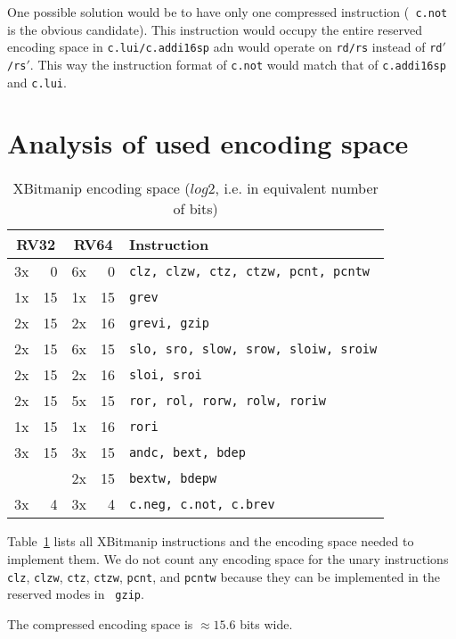One possible solution would be to have only one compressed instruction ({\tt
c.not} is the obvious candidate). This instruction would occupy the entire
reserved encoding space in {\tt c.lui/c.addi16sp} adn would operate on {\tt rd/rs}
instead of {\tt rd$'$/rs$'$}. This way the instruction format of {\tt c.not}
would match that of {\tt c.addi16sp} and {\tt c.lui}.

\section{Analysis of used encoding space}

\begin{table}
\begin{center}
\begin{tabular}{rr|rr|l}
\multicolumn{2}{c|}{RV32} & \multicolumn{2}{c|}{RV64} & Instruction \\
\hline
3x &  0 & 6x &  0 & {\tt clz, clzw, ctz, ctzw, pcnt, pcntw} \\
\hline
1x & 15 & 1x & 15 & {\tt grev} \\
2x & 15 & 2x & 16 & {\tt grevi, gzip} \\
\hline
2x & 15 & 6x & 15 & {\tt slo, sro, slow, srow, sloiw, sroiw} \\
2x & 15 & 2x & 16 & {\tt sloi, sroi} \\
\hline
2x & 15 & 5x & 15 & {\tt ror, rol, rorw, rolw, roriw} \\
1x & 15 & 1x & 16 & {\tt rori} \\
\hline
3x & 15 & 3x & 15 & {\tt andc, bext, bdep} \\
   &    & 2x & 15 & {\tt bextw, bdepw} \\
\hline
3x &  4 & 3x &  4 & {\tt c.neg, c.not, c.brev} \\
\end{tabular}
\end{center}
\caption{XBitmanip encoding space ($log2$, i.e. in equivalent number of bits)}
\label{encspace-tab}
\end{table}

Table~\ref{encspace-tab} lists all XBitmanip instructions and the encoding
space needed to implement them.  We do not count any encoding space for the
unary instructions {\tt clz}, {\tt clzw}, {\tt ctz}, {\tt ctzw}, {\tt pcnt},
and {\tt pcntw} because they can be implemented in the reserved modes in {\tt
gzip}.

The compressed encoding space is $\approx 15.6$ bits wide.

